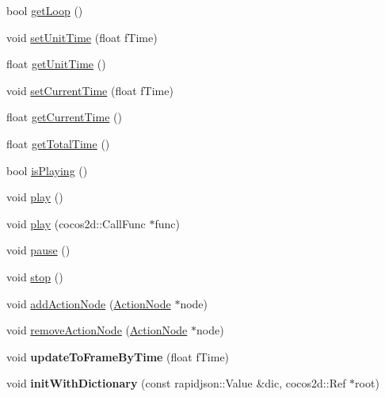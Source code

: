 \begin{DoxyCompactItemize}
bool \hyperlink{classcocostudio_1_1ActionObject_a47928c29236770a5df9dcc9a2405a032}{get\+Loop} ()
\item 
void \hyperlink{classcocostudio_1_1ActionObject_acc4551d83f908653f207de243da3dde3}{set\+Unit\+Time} (float f\+Time)
\item 
float \hyperlink{classcocostudio_1_1ActionObject_a4cf75b80f67a1a170616b39d352f989e}{get\+Unit\+Time} ()
\item 
void \hyperlink{classcocostudio_1_1ActionObject_a031f6e35417d37f74d303c816284c11f}{set\+Current\+Time} (float f\+Time)
\item 
float \hyperlink{classcocostudio_1_1ActionObject_a3937f4c1b4897d30662266535c1264a0}{get\+Current\+Time} ()
\item 
float \hyperlink{classcocostudio_1_1ActionObject_a8df3a8c5f7bc60f29e783f44830fab67}{get\+Total\+Time} ()
\item 
bool \hyperlink{classcocostudio_1_1ActionObject_ab3a5940502a32dbd778990dc1a47389a}{is\+Playing} ()
\item 
void \hyperlink{classcocostudio_1_1ActionObject_afc5c69af1ec901b81461beb4f0c094cc}{play} ()
\item 
void \hyperlink{classcocostudio_1_1ActionObject_a2be572de273340713eb91f0393a336ed}{play} (cocos2d\+::\+Call\+Func $\ast$func)
\item 
void \hyperlink{classcocostudio_1_1ActionObject_a96d9dcb811d26e9c3ca729f9ec51f18a}{pause} ()
\item 
void \hyperlink{classcocostudio_1_1ActionObject_ad9616450d0b1c27499fc2ae17d1259be}{stop} ()
\item 
void \hyperlink{classcocostudio_1_1ActionObject_a8ab2a16c12741039440d78629bda657a}{add\+Action\+Node} (\hyperlink{classcocostudio_1_1ActionNode}{Action\+Node} $\ast$node)
\item 
void \hyperlink{classcocostudio_1_1ActionObject_a2923d174d80fb1a62749b32fdeb9b056}{remove\+Action\+Node} (\hyperlink{classcocostudio_1_1ActionNode}{Action\+Node} $\ast$node)
\item 
\mbox{\label{classcocostudio_1_1ActionObject_a58d7a6b9678f6e56aa210a5aaf4bcb5f}} 
void {\bfseries update\+To\+Frame\+By\+Time} (float f\+Time)
\item 
\mbox{\label{classcocostudio_1_1ActionObject_aa480973dc173a52d1ba126e4b5858fda}} 
void {\bfseries init\+With\+Dictionary} (const rapidjson\+::\+Value \&dic, cocos2d\+::\+Ref $\ast$root)

\end{DoxyCompactItemize}

